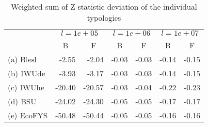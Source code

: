 \begin{table}[htb]
\centering
\caption{Weighted sum of Z-statistic deviation of the individual typologies}
\label{tab:WSZ}
\begin{tabular}{l rr rr rr}
\toprule
 & \multicolumn{2}{c}{$l = 1e+05$}
 & \multicolumn{2}{c}{$l = 1e+06$}
 & \multicolumn{2}{c}{$l = 1e+07$}
 \\
 & \multicolumn{1}{c}{B} & \multicolumn{1}{c}{F} & 
   \multicolumn{1}{c}{B} & \multicolumn{1}{c}{F} & 
   \multicolumn{1}{c}{B} & \multicolumn{1}{c}{F} \\
\midrule

(a) Blesl  &   -2.55 &   -2.04 &  -0.03 &  -0.03 &  -0.14 &  -0.15 \\
(b) IWUde  &   -3.93 &   -3.17 &  -0.03 &  -0.03 &  -0.14 &  -0.15 \\
(c) IWUhe  &  -20.40 &  -20.57 &  -0.03 &  -0.04 &  -0.22 &  -0.23 \\
(d) BSU    &  -24.02 &  -24.30 &  -0.05 &  -0.05 &  -0.17 &  -0.17 \\
(e) EcoFYS &  -50.48 &  -50.44 &  -0.05 &  -0.05 &  -0.16 &  -0.16 \\

\bottomrule
\end{tabular}
\end{table}